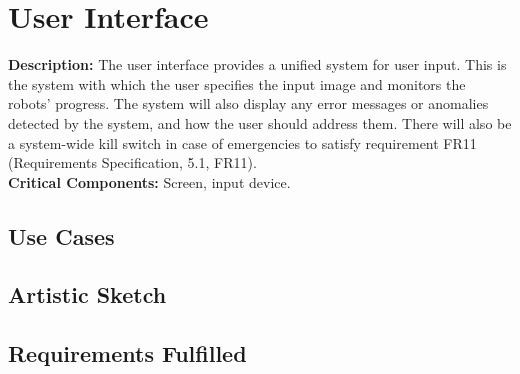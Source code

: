 
\section{User Interface}
\label{sec:user_interface}
\textbf{Description:} The user interface provides a unified system for user input. This is the system with which the user specifies the input image and monitors the robots' progress. The system will also display any error messages or anomalies detected by the system, and how the user should address them. There will also be a system-wide kill switch in case of emergencies to satisfy requirement FR11 (Requirements Specification, 5.1, FR11). \\
\textbf{Critical Components:} Screen, input device. \\

\subsection{Use Cases}

\subsection{Artistic Sketch}

\subsection{Requirements Fulfilled}